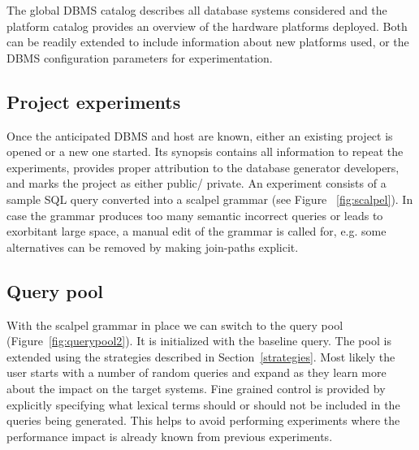 \documentclass{cidr-2019}
\begin{document}

The global DBMS catalog describes all database systems considered and
the platform catalog provides an overview of the hardware platforms
deployed. Both can be readily extended to include information about
new platforms used, or the DBMS configuration parameters for
experimentation.

\subsection{Project experiments}
Once the anticipated DBMS and host are known, either an existing
project is opened or a new one started. Its synopsis contains all
information to repeat the experiments, provides proper attribution to
the database generator developers, and marks the project as either
public/ private. An experiment consists of a sample SQL query
converted into a scalpel grammar (see Figure ~\ref{fig:scalpel}). In
case the grammar produces too many semantic incorrect queries or leads
to exorbitant large space, a manual edit of the grammar is called
for, e.g. some alternatives can be removed by making join-paths
explicit.

\subsection{Query pool}
With the scalpel grammar in place we can switch to the query pool
(Figure~\ref{fig:querypool2}). It is initialized with the baseline
query.
The pool is extended using the strategies described in
Section~\ref{strategies}. Most likely the user starts with a number of
random queries and expand as they learn more about the impact on the
target systems. Fine grained control is provided by explicitly
specifying what lexical terms should or should not be included in the
queries being generated. This helps to avoid performing experiments
where the performance impact is already known from previous
experiments.
\end{document}
